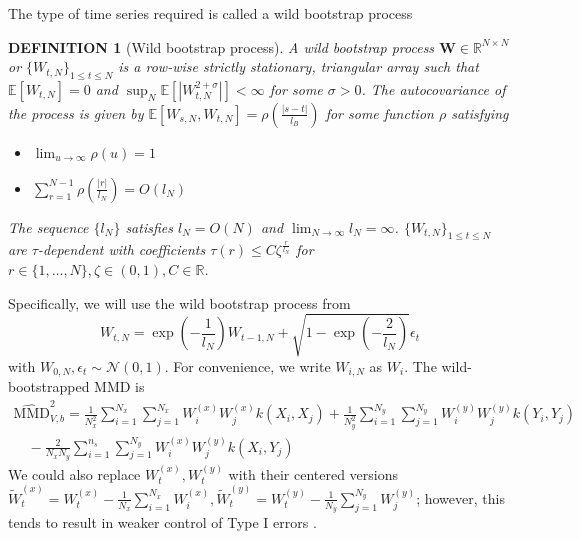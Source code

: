\documentclass[a4paper,11pt]{article}
\newtheorem{definition}[theorem]{DEFINITION}
\newcommand{\E}{\mathbb{E}}
\begin{document}
The type of time series required is called a wild bootstrap process
\begin{definition}[Wild bootstrap process]
A wild bootstrap process $\mathbf{W} \in \mathbb{R}^{N \times N}$ or $\{W_{t, N}\}_{1 \leq t \leq N}$ is a row-wise strictly stationary, triangular array such that $\E[W_{t,N}] = 0$ and $\sup_{N} \E[|W_{t,N}^{2+\sigma}|]<\infty$ for some $\sigma > 0$. The autocovariance of the process is given by $\E[W_{s,N}, W_{t,N}] = \rho(\frac{|s-t|}{l_{B}})$ for some function $\rho$ satisfying 
\begin{itemize}
    \item $\lim_{u\rightarrow\infty} \rho(u)=1$
    \item $\sum_{r=1}^{N-1} \rho(\frac{|r|}{l_{N}}) = O(l_{N})$
\end{itemize}
The sequence $\{l_{N}\}$ satisfies $l_{N}=O(N)$ and $\lim_{N\rightarrow \infty}l_{N} = \infty$. $\{W_{t, N}\}_{1 \leq t \leq N}$ are $\tau$-dependent with coefficients $\tau(r) \leq C\zeta^{\frac{r}{l_{N}}}$ for $r \in \{1, \ldots, N\}, \zeta \in (0,1), C \in \mathbb{R}$.
\end{definition}
Specifically, we will use the wild bootstrap process from \cite{leucht_dependent_2013, chwialkowski_wild_2016}
\begin{equation}
    W_{t, N}=\exp{\left(-\frac{1}{l_{N}}\right)} W_{t-1, N}+\sqrt{1-\exp{\left(-\frac{2}{l_{N}}\right)}} \epsilon_{t}
    \label{eq:wb_process}
\end{equation}
with $W_{0,N}, \epsilon_{t} \sim \mathcal{N}(0,1)$. For convenience, we write $W_{i,N}$ as $W_{i}$. The wild-bootstrapped MMD is
\begin{equation}
\begin{array}{c}
\widehat{\mathrm{MMD}}^{2}_{V, b}=\frac{1}{N_{x}^{2}} \sum_{i=1}^{N_{x}} \sum_{j=1}^{N_{x}} W_{i}^{(x)} W_{j}^{(x)} k\left(X_{i}, X_{j}\right)+\frac{1}{N_{y}^{2}} \sum_{i=1}^{N_{y}} \sum_{j=1}^{N_{y}} W_{i}^{(y)} W_{j}^{(y)} k\left(Y_{i}, Y_{j}\right) \\
\quad-\frac{2}{N_{x} N_{y}} \sum_{i=1}^{n_{s}} \sum_{j=1}^{N_{y}} W_{i}^{(x)} W_{j}^{(y)} k\left(X_{i}, Y_{j}\right)
\end{array}
\label{eq:wb_mmd}
\end{equation}
We could also replace $W_{t}^{(x)}, W_{t}^{(y)}$ with their centered versions $\tilde{W}_{t}^{(x)}=W_{t}^{(x)}-\frac{1}{N_{x}} \sum_{i=1}^{N_{x}} W_{i}^{(x)}, \tilde{W}_{t}^{(y)}=W_{t}^{(y)}-\frac{1}{N_{y}} \sum_{j=1}^{N_{y}} W_{j}^{(y)}$; however, this tends to result in weaker control of Type I errors \cite{chwialkowski_wild_2016}.
\end{document}
